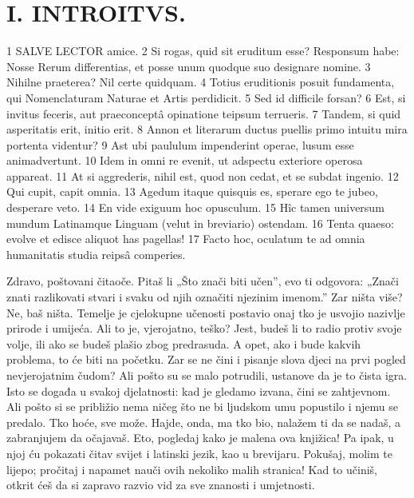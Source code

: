 
\section*{I. INTROITVS.}

1 SALVE LECTOR amice. 2 Si rogas, quid sit eruditum esse? Responsum habe: Nosse Rerum differentias, et posse unum quodque suo designare nomine. 3 Nihilne praeterea? Nil certe quidquam. 4 Totius eruditionis posuit fundamenta, qui Nomenclaturam Naturae et Artis perdidicit. 5 Sed id difficile forsan? 6 Est, si invitus feceris, aut praeconceptâ opinatione teipsum terrueris. 7 Tandem, si quid asperitatis erit, initio erit. 8 Annon et literarum ductus puellis primo intuitu mira portenta videntur? 9 Ast ubi paululum impenderint operae, lusum esse animadvertunt. 10 Idem in omni re evenit, ut adspectu exteriore operosa appareat. 11 At si aggrederis, nihil est, quod non cedat, et se subdat ingenio. 12 Qui cupit, capit omnia. 13 Agedum itaque quisquis es, sperare ego te jubeo, desperare veto. 14 En vide exiguum hoc opusculum. 15 Hîc tamen universum mundum Latinamque Linguam (velut in breviario) ostendam. 16 Tenta quaeso: evolve et edisce aliquot has pagellas! 17 Facto hoc, oculatum te ad omnia humanitatis studia reipsâ comperies.

\bigskip

Zdravo, poštovani čitaoče. Pitaš li „Što znači biti učen”, evo ti odgovora: „Znači znati razlikovati stvari i svaku od njih označiti njezinim imenom.” Zar ništa više? Ne, baš ništa. Temelje je cjelokupne učenosti postavio onaj tko je usvojio nazivlje prirode i umijeća. Ali to je, vjerojatno, teško? Jest, budeš li to radio protiv svoje volje, ili ako se budeš plašio zbog predrasuda. A opet, ako i bude kakvih problema, to će biti na početku. Zar se ne čini i pisanje slova djeci na prvi pogled nevjerojatnim čudom? Ali pošto su se malo potrudili, ustanove da je to čista igra. Isto se događa u svakoj djelatnosti: kad je gledamo izvana, čini se zahtjevnom. Ali pošto si se približio nema ničeg što ne bi ljudskom umu popustilo i njemu se predalo. Tko hoće, sve može. Hajde, onda, ma tko bio, nalažem ti da se nadaš, a zabranjujem da očajavaš. Eto, pogledaj kako je malena ova knjižica! Pa ipak, u njoj ću pokazati čitav svijet i latinski jezik, kao u brevijaru. Pokušaj, molim te lijepo; pročitaj i napamet nauči ovih nekoliko malih stranica! Kad to učiniš, otkrit ćeš da si zapravo razvio vid za sve znanosti i umjetnosti.


